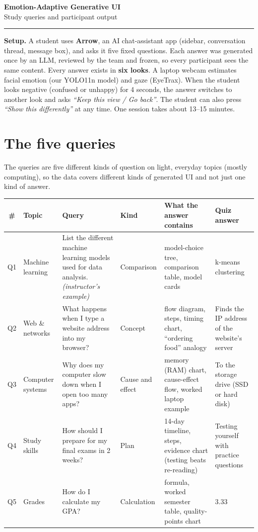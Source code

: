 \documentclass[10pt,a4paper]{article}
\begin{document}
{\LARGE\bfseries Emotion-Adaptive Generative UI}\\[2pt]
{\large Study queries and participant output}\\[-4pt]
{\color{accent}\rule{\linewidth}{0.8pt}}

\textbf{Setup.} A student uses \textbf{Arrow}, an AI chat-assistant app (sidebar, conversation thread, message box), and asks it
five fixed questions. Each answer was generated once by an LLM, reviewed by the team and frozen, so every participant
sees the same content. Every answer exists in \textbf{six looks}. A laptop webcam estimates facial emotion (our YOLO11n
model) and gaze (EyeTrax). When the student looks negative (confused or unhappy) for 4 seconds, the answer switches to
another look and asks \emph{``Keep this view / Go back''}. The student can also press \emph{``Show this differently''} at
any time. One session takes about 13--15 minutes.

\section{The five queries}
The queries are five different kinds of question on light, everyday topics (mostly computing), so the data covers
different kinds of generated UI and not just one kind of answer.

\begin{center}
\small
{}
\begin{tabularx}{\linewidth}{@{}c p{2.1cm} L p{1.9cm} L p{2.5cm}@{}}
\toprule
\textbf{\#} & \textbf{Topic} & \textbf{Query} & \textbf{Kind} & \textbf{What the answer contains} & \textbf{Quiz answer} \\
\midrule
Q1 & Machine learning & List the different machine learning models used for data analysis. \emph{(instructor's example)}
   & Comparison & model-choice tree, comparison table, model cards & k-means clustering \\
Q2 & Web \& networks & What happens when I type a website address into my browser?
   & Concept & flow diagram, steps, timing chart, ``ordering food'' analogy & Finds the IP address of the website's server \\
Q3 & Computer systems & Why does my computer slow down when I open too many apps?
   & Cause and effect & memory (RAM) chart, cause-effect flow, worked laptop example & To the storage drive (SSD or hard disk) \\
Q4 & Study skills & How should I prepare for my final exams in 2 weeks?
   & Plan & 14-day timeline, steps, evidence chart (testing beats re-reading) & Testing yourself with practice questions \\
Q5 & Grades & How do I calculate my GPA?
   & Calculation & formula, worked semester table, quality-points chart & 3.33 \\
\bottomrule
\end{tabularx}
\end{center}
\end{document}
